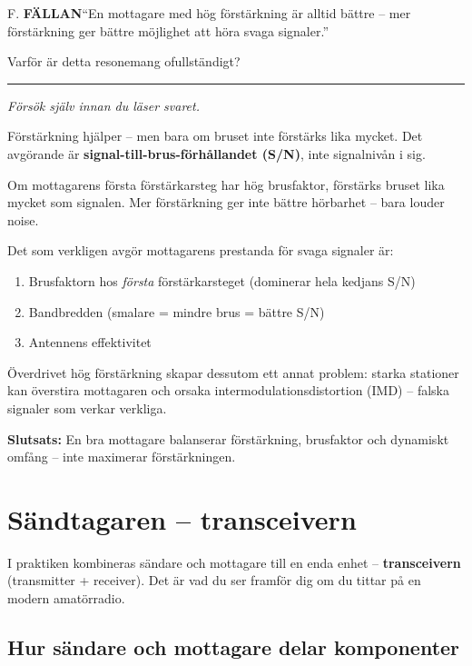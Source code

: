 \documentclass[a4paper,11pt,twoside]{book}
\newcommand{\qfallan}{\colorbox{ljusbrun}{\textcolor{kakao}{\headingfont\bfseries\tiny FÄLLAN}}}
\begin{document}
\begin{qblock}{F.}
\qfallan\quad ``En mottagare med hög förstärkning är alltid
bättre -- mer förstärkning ger bättre möjlighet att höra svaga
signaler.''

Varför är detta resonemang ofullständigt?
\end{qblock}

\medskip
\noindent\rule{\textwidth}{0.4pt}
{\small\itshape Försök själv innan du läser svaret.}
\medskip

\begin{worked}[title={Lösning -- Fallgropsfråga 2.4\,F}]
Förstärkning hjälper -- men bara om bruset inte förstärks lika
mycket. Det avgörande är \textbf{signal-till-brus-förhållandet (S/N)},
inte signalnivån i sig.

Om mottagarens första förstärkarsteg har hög brusfaktor, förstärks
bruset lika mycket som signalen. Mer förstärkning ger inte bättre
hörbarhet -- bara louder noise.

Det som verkligen avgör mottagarens prestanda för svaga signaler är:
\begin{enumerate}
  \item Brusfaktorn hos \emph{första} förstärkarsteget (dominerar hela kedjans S/N)
  \item Bandbredden (smalare = mindre brus = bättre S/N)
  \item Antennens effektivitet
\end{enumerate}

Överdrivet hög förstärkning skapar dessutom ett annat problem:
starka stationer kan överstira mottagaren och orsaka
intermodulationsdistortion (IMD) -- falska signaler som verkar
verkliga.

\textbf{Slutsats:} En bra mottagare balanserar förstärkning,
brusfaktor och dynamiskt omfång -- inte maximerar förstärkningen.
\end{worked}

\section{Sändtagaren -- transceivern}

I praktiken kombineras sändare och mottagare till en enda enhet --
\textbf{transceivern} (transmitter + receiver). Det är vad du
ser framför dig om du tittar på en modern amatörradio.

\subsection{Hur sändare och mottagare delar komponenter}
\end{document}
